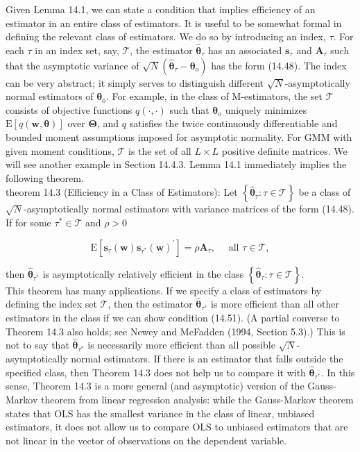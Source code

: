 \documentclass[10pt]{article}
\begin{document}
Given Lemma 14.1, we can state a condition that implies efficiency of an estimator in an entire class of estimators. It is useful to be somewhat formal in defining the relevant class of estimators. We do so by introducing an index, $\tau$. For each $\tau$ in an index set, say, $\mathscr{T}$, the estimator $\hat{\boldsymbol{\theta}}_{\tau}$ has an associated $\mathbf{s}_{\tau}$ and $\mathbf{A}_{\tau}$ such that the asymptotic variance of $\sqrt{N}\left(\hat{\boldsymbol{\theta}}_{\tau}-\boldsymbol{\theta}_{\mathrm{o}}\right)$ has the form (14.48). The index can be very abstract; it simply serves to distinguish different $\sqrt{N}$-asymptotically normal estimators of $\boldsymbol{\theta}_{\mathrm{o}}$. For example, in the class of M-estimators, the set $\mathscr{T}$ consists of objective functions $q(\cdot, \cdot)$ such that $\boldsymbol{\theta}_{\mathrm{o}}$ uniquely minimizes $\mathrm{E}[q(\mathbf{w}, \boldsymbol{\theta})]$ over $\boldsymbol{\Theta}$, and $q$ satisfies the twice continuously differentiable and bounded moment assumptions imposed for asymptotic normality. For GMM with given moment conditions, $\mathscr{T}$ is the set of all $L \times L$ positive definite matrices. We will see another example in Section 14.4.3. Lemma 14.1 immediately implies the following theorem.\\
theorem 14.3 (Efficiency in a Class of Estimators): Let $\left\{\hat{\boldsymbol{\theta}}_{\tau}: \tau \in \mathscr{T}\right\}$ be a class of $\sqrt{N}$-asymptotically normal estimators with variance matrices of the form (14.48). If for some $\tau^{*} \in \mathscr{T}$ and $\rho>0$


\begin{equation*}
\mathrm{E}\left[\mathbf{s}_{\tau}(\mathbf{w}) \mathbf{s}_{\tau^{*}}(\mathbf{w})^{\prime}\right]=\rho \mathbf{A}_{\tau}, \quad \text { all } \tau \in \mathscr{T}, \tag{14.51}
\end{equation*}


then $\hat{\boldsymbol{\theta}}_{\tau^{*}}$ is asymptotically relatively efficient in the class $\left\{\hat{\boldsymbol{\theta}}_{\tau}: \tau \in \mathscr{T}\right\}$.\\
This theorem has many applications. If we specify a class of estimators by defining the index set $\mathscr{T}$, then the estimator $\hat{\boldsymbol{\theta}}_{\tau^{*}}$ is more efficient than all other estimators in the class if we can show condition (14.51). (A partial converse to Theorem 14.3 also holds; see Newey and McFadden (1994, Section 5.3).) This is not to say that $\hat{\boldsymbol{\theta}}_{\tau^{*}}$ is necessarily more efficient than all possible $\sqrt{N}$-asymptotically normal estimators. If there is an estimator that falls outside the specified class, then Theorem 14.3 does not help us to compare it with $\hat{\boldsymbol{\theta}}_{\tau^{*}}$. In this sense, Theorem 14.3 is a more general (and asymptotic) version of the Gauss-Markov theorem from linear regression analysis: while the Gauss-Markov theorem states that OLS has the smallest variance in the class of linear, unbiased estimators, it does not allow us to compare OLS to unbiased estimators that are not linear in the vector of observations on the dependent variable.
\end{document}
